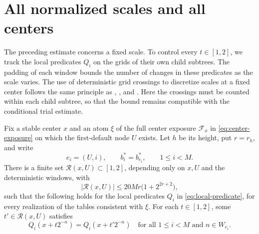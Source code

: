 \section{All normalized scales and all centers}
\label{sec:scales}

The preceding estimate concerns a fixed scale.  To control every
$t\in[1,2]$, we track the local predicates $Q_i$ on the grids of their
own child subtrees.  The padding of each window bounds the number of
changes in these predicates as the scale varies.
The use of deterministic grid crossings to discretize scales at a fixed
center follows the same principle as
\cite[Section~3.2]{Kolountzakis1997},
\cite[Section~5]{Chlebik2015}, and
\cite[Section~3.1]{KolountzakisPapageorgiou2025}.
Here the crossings must be counted within each child subtree, so that
the bound remains compatible with the conditional trial estimate.

\begin{lemma}\label{lem:representatives}
Fix a stable center $x$ and an atom $\xi$ of the full center exposure
$\mathcal F_x$ in \eqref{eq:center-exposure} on which the first-default node $U$ exists.  Let $h$ be
its height, put $r=r_h$, and write
\[
 e_i=(U,i),\qquad b_i^*=b_{e_i}^*,\qquad 1\le i<M.
\]
There is a finite set $\mathcal R(x,U)\subset[1,2]$, depending only on
$x,U$ and the deterministic windows, with
\begin{equation}
 |\mathcal R(x,U)|\le20Mr\bigl(1+2^{2r+2}\bigr),
 \label{eq:representative-count}
\end{equation}
such that the following holds for the local predicates $Q_i$ in
\eqref{eq:local-predicate}, for every realization of the tables
consistent with $\xi$.  For each $t\in[1,2]$, some
$t'\in\mathcal R(x,U)$ satisfies
\begin{equation}
 Q_i(x+t2^{-n})=Q_i(x+t'2^{-n})
 \quad\text{for all }1\le i<M\text{ and }n\in W_{e_i}.
 \label{eq:representative-agreement}
\end{equation}
\end{lemma}

